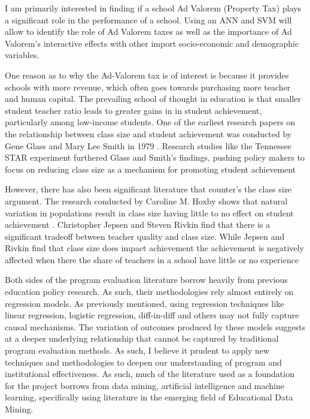 \documentclass[12pt,a4paper]{article}
\begin{document}
I am primarily interested in finding if a school Ad Valorem (Property Tax) plays a significant role in the performance of a school. Using an ANN and SVM will allow to identify the role of Ad Valorem taxes as well as the importance of Ad Valorem's interactive effects with other import socio-economic and demographic variables. 

One reason as to why the Ad-Valorem tax is of interest is because it provides schools with more revenue, which often goes towards purchasing more teacher and human capital. The prevailing school of thought in education is that smaller student teacher ratio leads to greater gains in in student achievement, particularly among low-income students. One of the earliest research papers on the relationship between class size and student achievement was conducted by Gene Glass and Mary Lee Smith in 1979 \cite{glass} \cite{huebner}. Research studies like the Tennessee STAR experiment furthered Glass and Smith’s findings, pushing policy makers to focus on reducing class size as a mechanism for promoting student achievement \cite{finn} \cite{mosteller} \cite{grimmer}

However, there has also been significant literature that counter’s the class size argument. The research conducted by Caroline M. Hoxby shows that natural variation in populations result in class size having little to no effect on student achievement \cite{hoxby}. Christopher Jepsen and Steven Rivkin find that there is a significant tradeoff between teacher quality and class size. While Jepsen and Rivkin find that class size does impact achievement the achievement is negatively affected when there the share of teachers in a school have little or no experience \cite{jepsen} 

Both sides of the program evaluation literature borrow heavily from previous education policy research. As such, their methodologies rely almost entirely on regression models. As previously mentioned, using regression techniques like linear regression, logistic regression, diff-in-diff and others may not fully capture causal mechanisms. The variation of outcomes produced by these models suggests at a deeper underlying relationship that cannot be captured by traditional program evaluation methods. As such, I believe it prudent to apply new techniques and methodologies to deepen our understanding of program and institutional effectiveness. As such, much of the literature used as a foundation for the project borrows from data mining, artificial intelligence and machine learning, specifically using literature in the emerging field of Educational Data Mining.
\end{document}
